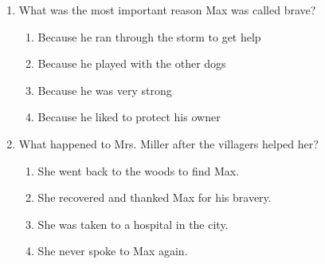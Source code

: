 \documentclass[12pt]{article}
\begin{document}
\begin{enumerate}
    \vspace{0.5cm}

    \item What was the most important reason Max was called brave?

    \begin{enumerate}[label=\Alph*.]
        \item Because he ran through the storm to get help
        \item Because he played with the other dogs
        \item Because he was very strong
        \item Because he liked to protect his owner
    \end{enumerate}
    
    \vspace{0.5cm}

    \item What happened to Mrs. Miller after the villagers helped her?

    \begin{enumerate}[label=\Alph*.]
        \item She went back to the woods to find Max.
        \item She recovered and thanked Max for his bravery.
        \item She was taken to a hospital in the city.
        \item She never spoke to Max again.
    \end{enumerate}

\end{enumerate}
\end{document}
